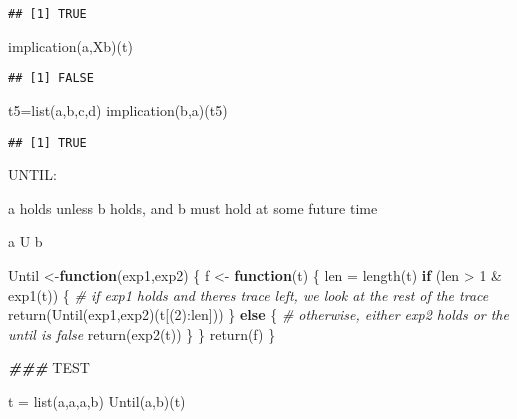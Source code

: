 \documentclass[
]{article}
\newenvironment{Shaded}{\begin{snugshade}}{\end{snugshade}}
\newcommand{\AlertTok}[1]{\textcolor[rgb]{0.94,0.16,0.16}{#1}}
\newcommand{\CommentTok}[1]{\textcolor[rgb]{0.56,0.35,0.01}{\textit{#1}}}
\newcommand{\ControlFlowTok}[1]{\textcolor[rgb]{0.13,0.29,0.53}{\textbf{#1}}}
\newcommand{\DecValTok}[1]{\textcolor[rgb]{0.00,0.00,0.81}{#1}}
\newcommand{\DocumentationTok}[1]{\textcolor[rgb]{0.56,0.35,0.01}{\textbf{\textit{#1}}}}
\newcommand{\FunctionTok}[1]{\textcolor[rgb]{0.00,0.00,0.00}{#1}}
\newcommand{\NormalTok}[1]{#1}
\newcommand{\OtherTok}[1]{\textcolor[rgb]{0.56,0.35,0.01}{#1}}
\newcommand{\SpecialCharTok}[1]{\textcolor[rgb]{0.00,0.00,0.00}{#1}}
\newcommand{\StringTok}[1]{\textcolor[rgb]{0.31,0.60,0.02}{#1}}
\begin{document}
\begin{verbatim}
## [1] TRUE
\end{verbatim}

\begin{Shaded}
\begin{Highlighting}[]
\FunctionTok{implication}\NormalTok{(a,Xb)(t)}
\end{Highlighting}
\end{Shaded}

\begin{verbatim}
## [1] FALSE
\end{verbatim}

\begin{Shaded}
\begin{Highlighting}[]
\NormalTok{t5}\OtherTok{=}\FunctionTok{list}\NormalTok{(}\StringTok{\textquotesingle{}a\textquotesingle{}}\NormalTok{,}\StringTok{\textquotesingle{}b\textquotesingle{}}\NormalTok{,}\StringTok{\textquotesingle{}c\textquotesingle{}}\NormalTok{,}\StringTok{\textquotesingle{}d\textquotesingle{}}\NormalTok{)}
\FunctionTok{implication}\NormalTok{(b,a)(t5)}
\end{Highlighting}
\end{Shaded}

\begin{verbatim}
## [1] TRUE
\end{verbatim}

UNTIL:

a holds unless b holds, and b must hold at some future time

a U b

\begin{Shaded}
\begin{Highlighting}[]
\NormalTok{Until }\OtherTok{\textless{}{-}}\ControlFlowTok{function}\NormalTok{(exp1,exp2)}
\NormalTok{\{}
\NormalTok{  f }\OtherTok{\textless{}{-}} \ControlFlowTok{function}\NormalTok{(t)}
\NormalTok{  \{}
\NormalTok{    len }\OtherTok{=} \FunctionTok{length}\NormalTok{(t)}
    \ControlFlowTok{if}\NormalTok{ (len }\SpecialCharTok{\textgreater{}} \DecValTok{1} \SpecialCharTok{\&} \FunctionTok{exp1}\NormalTok{(t))}
\NormalTok{    \{}
      \CommentTok{\# if exp1 holds and there\textquotesingle{}s trace left, we look at the rest of the trace}
      \FunctionTok{return}\NormalTok{(}\FunctionTok{Until}\NormalTok{(exp1,exp2)(t[(}\DecValTok{2}\NormalTok{)}\SpecialCharTok{:}\NormalTok{len]))}
\NormalTok{    \} }\ControlFlowTok{else}\NormalTok{ \{}
      \CommentTok{\# otherwise, either exp2 holds or the until is false}
      \FunctionTok{return}\NormalTok{(}\FunctionTok{exp2}\NormalTok{(t))}
\NormalTok{    \}}
\NormalTok{  \}}
  \FunctionTok{return}\NormalTok{(f)}
\NormalTok{\}}

\DocumentationTok{\#\#\# }\AlertTok{TEST}\DocumentationTok{ }

\NormalTok{t }\OtherTok{=} \FunctionTok{list}\NormalTok{(}\StringTok{\textquotesingle{}a\textquotesingle{}}\NormalTok{,}\StringTok{\textquotesingle{}a\textquotesingle{}}\NormalTok{,}\StringTok{\textquotesingle{}a\textquotesingle{}}\NormalTok{,}\StringTok{\textquotesingle{}b\textquotesingle{}}\NormalTok{)}
\FunctionTok{Until}\NormalTok{(a,b)(t)}
\end{Highlighting}
\end{Shaded}
\end{document}
